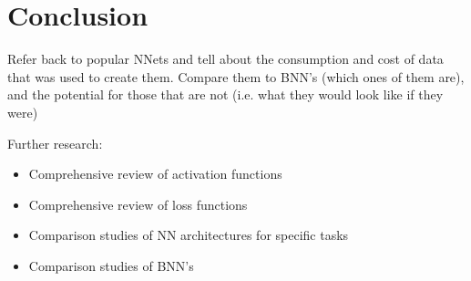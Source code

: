\chapter{Conclusion}

Refer back to popular NNets and tell about the consumption and cost of data that was used to create them.  Compare them to BNN's (which ones of them are), and the potential for those that are not (i.e. what they would look like if they were)


Further research:
\begin{itemize}
\tightlist
    \item Comprehensive review of activation functions
    \item Comprehensive review of loss functions
    \item Comparison studies of NN architectures for specific tasks
    \item Comparison studies of BNN's
\end{itemize}


